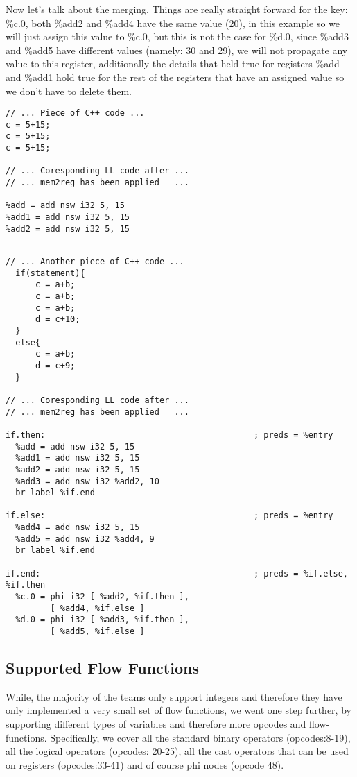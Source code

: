 Now let's talk about the merging. Things are really straight forward for the key: \%c.0, both \%add2 and \%add4 have the same value (20), in this example so we will just assign this value to \%c.0, but this is not the case for \%d.0, since \%add3 and \%add5 have different values (namely: 30 and 29), we will not propagate any value to this register, additionally the details that held true for registers \%add and \%add1 hold true for the rest of the registers that have an assigned value so we don't have to delete them. 


\begin{lstlisting}[caption=SSA preview, label=SSA]
// ... Piece of C++ code ...
c = 5+15;
c = 5+15;
c = 5+15;

// ... Coresponding LL code after ...
// ... mem2reg has been applied   ...

%add = add nsw i32 5, 15
%add1 = add nsw i32 5, 15
%add2 = add nsw i32 5, 15

\end{lstlisting}

\begin{lstlisting}[caption=SSA within a branch preview, label=SSAFF]

// ... Another piece of C++ code ...
  if(statement){
	  c = a+b;
	  c = a+b;
	  c = a+b;
	  d = c+10;
  }
  else{
	  c = a+b;
	  d = c+9;
  }

// ... Coresponding LL code after ...
// ... mem2reg has been applied   ...

if.then:                                          ; preds = %entry
  %add = add nsw i32 5, 15
  %add1 = add nsw i32 5, 15
  %add2 = add nsw i32 5, 15
  %add3 = add nsw i32 %add2, 10
  br label %if.end

if.else:                                          ; preds = %entry
  %add4 = add nsw i32 5, 15
  %add5 = add nsw i32 %add4, 9
  br label %if.end

if.end:                                           ; preds = %if.else, %if.then
  %c.0 = phi i32 [ %add2, %if.then ], 
         [ %add4, %if.else ]
  %d.0 = phi i32 [ %add3, %if.then ], 
         [ %add5, %if.else ]

  \end{lstlisting}
  
  
\subsection*{Supported Flow Functions}
While, the majority of the teams only support integers and therefore they have only implemented a very small set of flow functions, we went one step further, by supporting different types of variables and therefore more opcodes and flow-functions. Specifically, we cover all the standard binary operators (opcodes:8-19), all the logical operators (opcodes: 20-25), all the cast operators that can be used on registers (opcodes:33-41) and of course phi nodes (opcode 48). 



